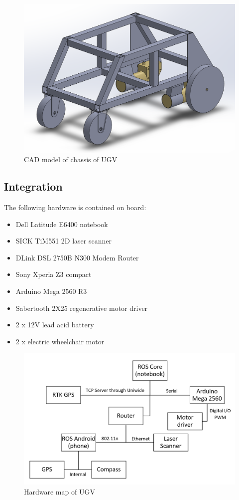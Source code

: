 \documentclass[titlepage,12pt,a4paper]{article}
\begin{document}
\begin{figure}[h!]
	\centering
	\includegraphics[scale=0.6]{figures/UGV.png}
	\caption{CAD model of chassis of UGV}
	\label{figure:ugv_chassis}
\end{figure}

\subsection{Integration}

The following hardware is contained on board:

\begin{itemize}
	\item Dell Latitude E6400 notebook
	\item SICK TiM551 2D laser scanner
	\item DLink DSL 2750B N300 Modem Router
	\item Sony Xperia Z3 compact
	\item Arduino Mega 2560 R3
	\item Sabertooth 2X25 regenerative motor driver
	\item 2 x 12V lead acid battery
	\item 2 x electric wheelchair motor
\end{itemize}

\begin{figure}[h!]
	\centering
	\includegraphics[scale=0.6]{figures/hardware_chart.png}
	\caption{Hardware map of UGV}
	\label{figure:hardware_chart}
\end{figure}
\end{document}
